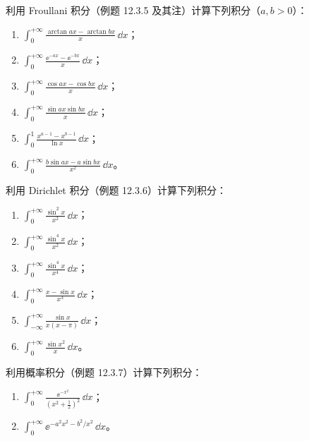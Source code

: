 \begin{xexercise}[4]
利用 Froullani 积分（例题 12.3.5 及其注）计算下列积分（$a,b>0$）：
  \begin{enumerate}[label=(\arabic*)]
    \item $\displaystyle\int_0^{+\infty}\frac{\arctan ax-\arctan bx}{x}\,\dd x$；
    \item $\displaystyle\int_0^{+\infty}\frac{\ee^{-ax}-\ee^{-bx}}x\,\dd x$；
    \item $\displaystyle\int_0^{+\infty}\frac{\cos ax-\cos bx}{x}\,\dd x$；
    \item $\displaystyle\int_0^{+\infty}\frac{\sin ax\sin bx}{x}\,\dd x$；
    \item $\displaystyle\int_0^1\frac{x^{a-1}-x^{b-1}}{\ln x}\,\dd x$；
    \item $\displaystyle\int_0^{+\infty}\frac{b\sin ax-a\sin bx}{x^2}\,\dd x$。
  \end{enumerate}
\end{xexercise}

\begin{xexercise}[5]
利用 Dirichlet 积分（例题 12.3.6）计算下列积分：
  \begin{enumerate}[label=(\arabic*)]
    \item $\displaystyle\int_0^{+\infty}\frac{\sin^2x}{x^2}\,\dd x$；
    \item $\displaystyle\int_0^{+\infty}\frac{\sin^4x}{x^2}\,\dd x$；
    \item $\displaystyle\int_0^{+\infty}\frac{\sin^4x}{x^4}\,\dd x$；
    \item $\displaystyle\int_0^{+\infty}\frac{x-\sin x}{x^3}\,\dd x$；
    \item $\displaystyle\int_{-\infty}^{+\infty}\frac{\sin x}{x(x-\pi)}\,\dd x$；
    \item $\displaystyle\int_0^{+\infty}\frac{\sin x^2}{x}\,\dd x$。
  \end{enumerate}
\end{xexercise}

\begin{xexercise}[6]
利用概率积分（例题 12.3.7）计算下列积分：
  \begin{enumerate}[label=(\arabic*)]
    \item $\displaystyle\int_0^{+\infty}\frac{\ee^{-x^2}}{(x^2+\frac12)^2}\,\dd x$；
    \item $\displaystyle\int_0^{+\infty}\ee^{-a^2x^2-b^2/x^2}\,\dd x$。
  \end{enumerate}
\end{xexercise}

